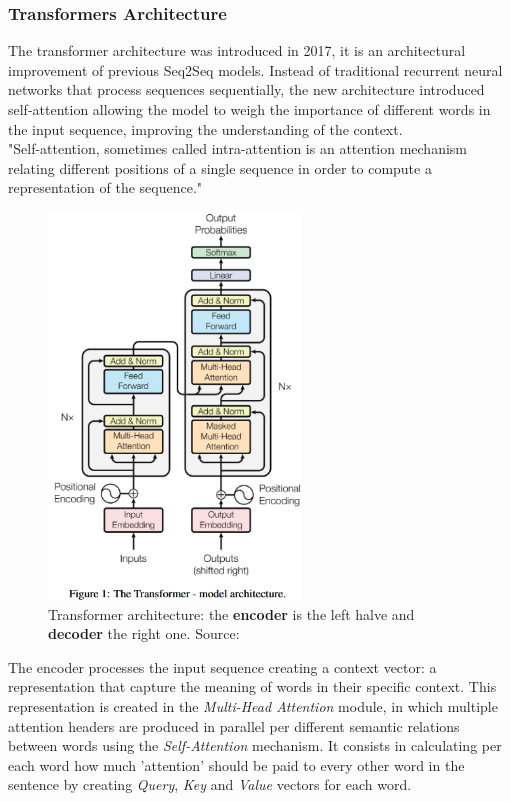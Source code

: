 \documentclass[12pt]{article}
\begin{document}
        \subsubsection{Transformers Architecture}
The transformer architecture was introduced in 2017, it is an architectural improvement of previous Seq2Seq models. Instead of traditional recurrent neural networks that process sequences sequentially, the new architecture introduced self-attention %
allowing the model to weigh the importance of different words in the input sequence, improving the understanding of the context.\\
"Self-attention, sometimes called intra-attention is an attention mechanism relating different positions of a single sequence in order to compute a representation of the sequence."\cite{vaswani2023attentionneed}\\
	\begin{figure}[H]
    \centering
            \includegraphics[width=0.6\textwidth]{transformer.png}
    \caption[Transformer architecture]{Transformer architecture: the \textbf{encoder} is the left halve and \textbf{decoder} the right one. Source: \cite{vaswani2023attentionneed}}
    \end{figure}
The encoder processes the input sequence creating a context vector: a representation that capture the meaning of words in their specific context. This representation is created in the \textit{Multi-Head Attention} module, in which multiple attention headers are produced in parallel per different semantic relations between words using the \textit{Self-Attention} mechanism. It consists in calculating per each word how much 'attention' should be paid to every other word in the sentence by creating \textit{Query}, \textit{Key} and \textit{Value} vectors for each word.
\end{document}
